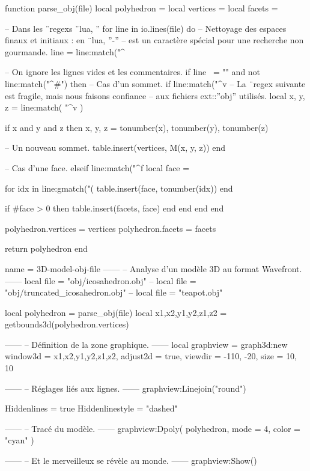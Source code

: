 \documentclass{standalone}
\begin{document}
\begin{luacode}
function parse_obj(file)
  local polyhedron = {}
  local vertices  = {}
  local facets    = {}

-- Dans les ¨regexs ¨lua, ''%
  for line in io.lines(file) do
-- Nettoyage des espaces finaux et initiaux : en ¨lua, ''-''
-- est un caractère spécial pour une recherche non gourmande.
    line = line:match("^%

-- On ignore les lignes vides et les commentaires.
    if line ~= "" and not line:match("^#") then
-- Cas d'un sommet.
      if line:match("^v%
-- La ¨regex suivante est fragile, mais nous faisons confiance
-- aux fichiers ext::''obj'' utilisés.
        local x, y, z = line:match(
          "^v%
        )

        if x and y and z then
          x, y, z = tonumber(x), tonumber(y), tonumber(z)

-- Un nouveau sommet.
          table.insert(vertices, M(x, y, z))
        end

-- Cas d'une face.
      elseif line:match("^f%
        local face = {}

        for idx in line:gmatch("(%
          table.insert(face, tonumber(idx))
        end

        if #face > 0 then
          table.insert(facets, face)
        end
      end
    end
  end

  polyhedron.vertices = vertices
  polyhedron.facets   = facets

  return polyhedron
end
\end{luacode}


\begin{luadraw}{name = 3D-model-obj-file}
------
-- Analyse d'un modèle 3D au format Wavefront.
------
local file = "obj/icosahedron.obj"
-- local file = "obj/truncated_icosahedron.obj"
-- local file = "teapot.obj"

local polyhedron = parse_obj(file)
local x1,x2,y1,y2,z1,z2 = getbounds3d(polyhedron.vertices)

------
-- Définition de la zone graphique.
------
local graphview = graph3d:new{
    window3d = {x1,x2,y1,y2,z1,z2},
    adjust2d = true, 
    viewdir = {-110, -20},
    size    = {10, 10}
}

------
-- Réglages liés aux lignes.
------
graphview:Linejoin("round")

Hiddenlines     = true
Hiddenlinestyle = "dashed"

------
-- Tracé du modèle.
------
graphview:Dpoly(
  polyhedron,
  {
    mode  = 4,
    color = "cyan"
  })

------
-- Et le merveilleux se révèle au monde.
------
graphview:Show()
\end{luadraw}
\end{document}
